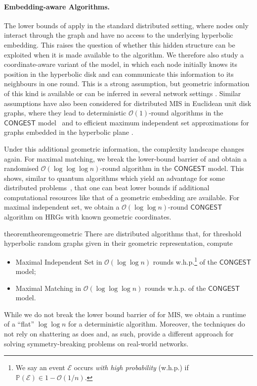 \documentclass[letterpaper,11pt]{article}
\newcommand{\Pro}[1]{\mathbb{P}\left(#1\right)}
\newcommand{\whp}{w.h.p.\xspace}
\newcommand{\1}{\mathbb I}
\newcommand{\bigO}{\mathcal{O}}
\newcommand{\CONGEST}{\ensuremath{\mathsf{CONGEST}}\xspace}
\begin{document}
\paragraph{Embedding-aware Algorithms.} The lower bounds of  apply in the standard distributed setting, where nodes only interact through the graph and have no access to the underlying hyperbolic embedding.  This raises the question of whether this hidden structure can be exploited when it is made available to the algorithm. We therefore also study a coordinate-aware variant of the model, in which each node initially knows its position in the hyperbolic disk and can communicate this information to its neighbours in one round. This is a strong assumption, but geometric information of this kind is available or can be inferred in several network settings \cite{Bogu2010}. Similar assumptions have also been considered for distributed MIS in Euclidean unit disk graphs, where they lead to deterministic $\bigO(1)$-round algorithms in the \CONGEST model~\cite{Molla2019} and to efficient maximum independent set approximations for graphs embedded in the hyperbolic plane \cite{bfk-tw-2016, thomas-socg-25}.

Under this additional geometric information, the complexity landscape changes again. For maximal matching, we break the lower-bound barrier of  and obtain a randomised $\bigO(\log\log\log n)$-round algorithm in the \CONGEST model.  This shows, similar to quantum algorithms which yield an advantage for some distributed problems~\cite{quantum-stoc, quantum-soda}, that one can beat lower bounds if additional computational resources like that of a geometric embedding are available. For maximal independent set, we obtain a $\bigO(\log\log n)$-round \CONGEST algorithm on HRGs with known geometric coordinates.
%
\begin{restatable}{theorem}{theoremgeometric}
\label{thm:geometric}
    There are distributed algorithms that, for threshold hyperbolic random graphs given in their geometric representation, compute 
     \begin{itemize}
        \item Maximal Independent Set in ${\bigO}(\log\log n)$ rounds \whp\footnote{We say an event $\mathcal{E}$ occurs \emph{with high probability} (\whp) if $\Pro{\mathcal{E}} \in 1 - \bigO(1/n)$.} of the \CONGEST model;
        \item Maximal Matching in ${\bigO}(\log\log\log n)$ rounds \whp of the \CONGEST model.
    \end{itemize}
\end{restatable}
%
While we do not break the lower bound barrier of  for MIS, we obtain a runtime of a ``flat'' $\log\log n$ for a deterministic algorithm. Moreover, the techniques do not rely on shattering as does  and, as such, provide a different approach for solving symmetry-breaking problems on real-world networks.
\end{document}
